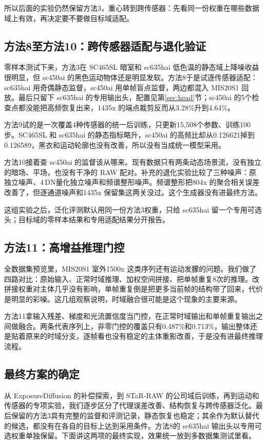 \documentclass[11pt,a4paper,UTF8,fontset=fandol]{ctexart}
\newcommand{\dn}{\ensuremath{\,\mathrm{DN}}}
\begin{document}
所以后面的实验仍然保留方法3，重心转到跨传感器：先看同一份权重在哪些数据域上有效，再决定要不要做目标域适配。

\subsection{方法8至方法10：跨传感器适配与退化验证}

零样本测试下来，方法3在 SC465SL 暗室和 sc635hai 低色温的静态域上降噪收益很明显，但 sc450ai 的黑色运动物体还是明显发软。方法8于是试逐传感器适配：sc635hai 用奇偶静态监督，sc450ai 用单帧盲点监督，两边都混入 MIS20S1 回放。最后只留下 sc635hai 的专用输出头，配置见第\ref{sec:head}节；sc450ai 的5个检查点都没能把高频恢复出来，1435x 的端点裁剪反而从3.28\%升到4.64\%。

方法9试的是一次覆盖4种传感器的统一后训练，只更新15,508个参数、训练100步。SC465SL 和 sc635hai 的静态指标略升，sc450ai 的高频比却从0.126621掉到0.126589，黑衣和运动轮廓也没有改善，所以没有当成统一模型采用。

方法10接着查 sc450ai 的监督该从哪来。现有数据只有两条动态场景流，没有独立的暗场、平场，也没有干净的 RAW 配对。补充的退化实验比较了三种噪声：原独立噪声、4\dn{}量化独立噪声和频谱整形噪声。频谱整形把804x 的聚合相关误差改善了，但逐通道噪声和1435x 保留集这两关没过。这个生成器没有进最终方法。

这组实验之后，泛化评测默认用同一份方法3权重，只给 sc635hai 留一个专用可选头；目标域的零样本结果和专用适配结果分开报告。

\subsection{方法11：高增益推理门控}

全数据集预览里，MIS20S1 室外1500x 这类序列还有运动发朦的问题。我们做了四路对比：原始输入、正常时域推理、加权空间拼接、把单帧重复8次的推理。改拼接权重对主体几乎没有影响，单帧重复倒是把更多当前帧的结构带了回来，代价是明显的彩噪。这几组观察说明，时域融合很可能是这个现象的主要来源。

方法11拿输入残差、梯度和光流置信度当门控，在正常时域输出和单帧重复输出之间做融合。两条代表序列上，非零门控的覆盖只有0.487\%和0.713\%，输出整体还是贴着原来的时域分支，逐帧看也没有稳定的主体重影改善，于是没有进最终推理流程。

\subsection{最终方案的确定}

从 ExposureDiffusion 的补偿探索，到 STaR-RAW 的公司域后训练，再到运动和传感器的专项实验，我们逐步区分了代理误差改善、结构恢复与跨传感器泛化。最后保留的方法3具有完整的监督和评测记录，静态恢复也稳定；其余作为默认替代的候选，都没有在各自的目标上达到采用条件。方法8的 sc635hai 输出头以专用可选权重单独保留。下面讲这两项的最终实现，效果统一放到多数据集测试里看。
\end{document}
